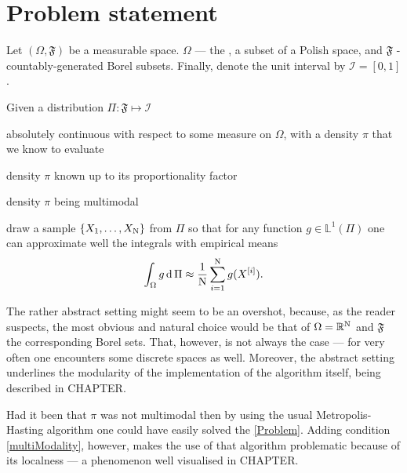 \documentclass{article}
\begin{document}
\section*{Problem statement}

Let $(\Omega, \mathfrak{F})$ be a measurable space. $\Omega$ --- the \sspace, a subset of a Polish space, and $\mathfrak{F}$ - countably-generated Borel subsets. Finally, denote the unit interval by $\mathcal{I} = [0,1]$. 

\begin{Problem}
	\item{\label{Problem}
		Given a distribution $\Pi: \mathfrak{F} \mapsto \mathcal{I}$
		\begin{Problem}
		 	\item absolutely continuous with respect to some measure on $\Omega$, with a density $\pi$ that we know to evaluate 
		 	\item density $\pi$ known up to its proportionality factor
		 	\item \label{multiModality}density $\pi$ being multimodal
		\end{Problem} 
		draw a sample $\{ X_1, \dots, X_{\mathrm{N}} \}$ from $\Pi$ so that for any function $g \in \mathbb{L}^1(\Pi)$ one can approximate well the integrals with empirical means
		$$\int_\Omega g \,\mathrm{d }\,\Pi \approx \frac{1}{\mathrm{N}}\sum_{i = 1}^{\mathrm{N}} g(X^{[i]}). $$ 
	}
\end{Problem}

The rather abstract setting might seem to be an overshot, because, as the reader suspects, the most obvious and natural choice would be that of $\Omega = \mathbb{R}^{\mathrm{N}}$ and $\mathfrak{F}$ the corresponding Borel sets. That, however, is not always the case --- for very often one encounters some discrete spaces as well. Moreover, the abstract setting underlines the modularity of the implementation of the algorithm itself, being described in CHAPTER.

Had it been that $\pi$ was not multimodal then by using the usual Metropolis-Hasting algorithm one could have easily solved the \ref{Problem}. Adding condition \ref{multiModality}, however, makes the use of that algorithm problematic because of its localness --- a phenomenon well visualised in CHAPTER.

\end{document}
